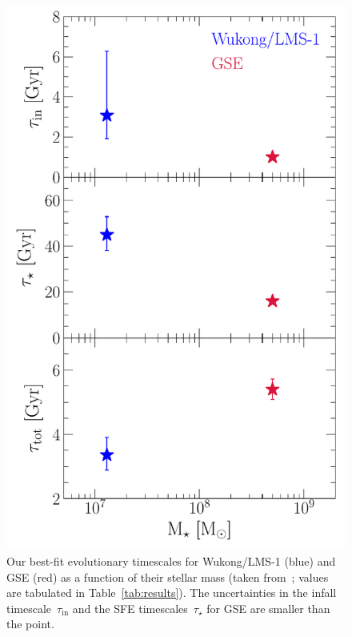 \begin{figure}
\centering
\includegraphics[scale = 0.63]{gse_wukong_timescales.pdf}
\caption{
Our best-fit evolutionary timescales for Wukong/LMS-1 (blue) and GSE (red) as a
function of their stellar mass (taken from~\citealt{Naidu2022}; values are
tabulated in Table~\ref{tab:results}).
The uncertainties in the infall timescale~$\tau_\text{in}$ and the SFE
timescales~$\tau_\star$ for GSE are smaller than the point.
}
\label{fig:gse_wukong_timescales}
\end{figure}

